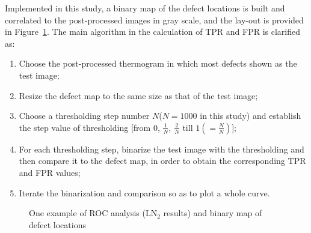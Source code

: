 Implemented in this study, a binary map of the defect locations is built and correlated to the post-processed images in gray scale, and the lay-out is provided in Figure~\ref{binary}.
The main algorithm in the calculation of TPR and FPR is clarified as:
\begin{enumerate}
   \item Choose the post-processed thermogram in which most defects shown as the test image;
   \item Resize the defect map to the same size as that of the test image;
   \item Choose a thresholding step number $N$($N=1000$ in this study) and establish the step value of thresholding [from $0$, $\frac{1}{N}$, $\frac{2}{N}$ till $1 (=\frac{N}{N})$];
   \item For each thresholding step, binarize the test image with the thresholding and then compare it to the defect map, in order to obtain the corresponding TPR and FPR values;
   \item Iterate the binarization and comparison so as to plot a whole curve.
\end{enumerate}


\begin{figure}[ht]
   \centering
   \caption{One example of ROC analysis (LN$_2$ results) and binary map of defect locations}
   \label{binary}
\end{figure}

